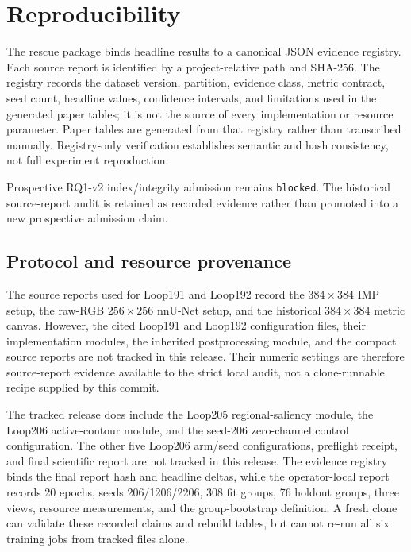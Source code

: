 \section{Reproducibility}

The rescue package binds headline results to a canonical JSON evidence registry. Each source report is identified by a project-relative path and SHA-256. The registry records the dataset version, partition, evidence class, metric contract, seed count, headline values, confidence intervals, and limitations used in the generated paper tables; it is not the source of every implementation or resource parameter. Paper tables are generated from that registry rather than transcribed manually. Registry-only verification establishes semantic and hash consistency, not full experiment reproduction.

Prospective RQ1-v2 index/integrity admission remains \texttt{blocked}. The historical source-report audit is retained as recorded evidence rather than promoted into a new prospective admission claim.

\subsection{Protocol and resource provenance}

The source reports used for Loop191 and Loop192 record the $384\times384$ IMP setup, the raw-RGB $256\times256$ nnU-Net setup, and the historical $384\times384$ metric canvas. However, the cited Loop191 and Loop192 configuration files, their implementation modules, the inherited postprocessing module, and the compact source reports are not tracked in this release. Their numeric settings are therefore source-report evidence available to the strict local audit, not a clone-runnable recipe supplied by this commit.

The tracked release does include the Loop205 regional-saliency module, the Loop206 active-contour module, and the seed-206 zero-channel control configuration. The other five Loop206 arm/seed configurations, preflight receipt, and final scientific report are not tracked in this release. The evidence registry binds the final report hash and headline deltas, while the operator-local report records 20 epochs, seeds 206/1206/2206, 308 fit groups, 76 holdout groups, three views, resource measurements, and the group-bootstrap definition. A fresh clone can validate these recorded claims and rebuild tables, but cannot re-run all six training jobs from tracked files alone.

